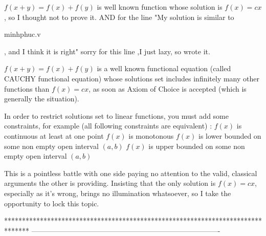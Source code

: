 


\begin{solution}
	\begin{tcolorbox}
$f(x+y)=f(x)+f(y)$ is well known function whose solution is  $f(x)=cx$, so I thought not to prove it. 
AND  for the line "My solution is similar to \begin{bolded}minhphuc.v\end{bolded}, and I think it is right" sorry for this line ,I just lazy, so wrote it.\end{tcolorbox}
$f(x+y)=f(x)+f(y)$ is a well known functional equation (called CAUCHY functional equation) whose solutions set includes infinitely many other functions than $f(x)=cx$, as soon as Axiom of Choice is accepted (which is generally the situation).

In order to restrict solutions set to linear functions, you must add some constraints, for example (all following constraints are equivalent) :
$f(x)$ is continuous at least at one point
$f(x)$ is monotonous
$f(x)$ is lower bounded on some non empty open interval $(a,b)$
$f(x)$ is upper bounded on some non empty open interval $(a,b)$
\end{solution}



\begin{solution}
	This is a pointless battle with one side paying no attention to the valid, classical arguments the other is providing. Insisting that the only solution is $f(x) = cx$, especially as it's wrong, brings no illumination whatsoever, so I take the opportunity to lock this topic.
\end{solution}
*******************************************************************************
-------------------------------------------------------------------------------

